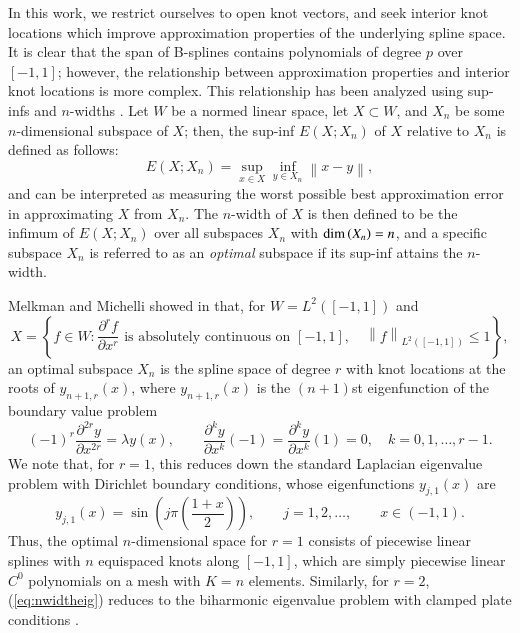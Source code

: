\documentclass[preprint,10pt]{elsarticle}
\newcommand{\pdn}[3]{\frac{\partial^{#3}#1}{\partial#2^{#3}}}
\newcommand{\nor}[1]{\left\| #1 \right\|}
\newcommand{\LRp}[1]{\left( #1 \right)}
\newcommand{\LRc}[1]{\left\{ #1 \right\}}
\begin{document}
In this work, we restrict ourselves to open knot vectors, and seek interior knot locations which improve approximation properties of the underlying spline space.  It is clear that the span of B-splines contains polynomials of degree $p$ over $[-1,1]$; however, the relationship between approximation properties and interior knot locations is more complex.  This relationship has been analyzed using sup-infs and $n$-widths \cite{kolmogoroffOber1936, melkman1978spline, schumaker2007spline, evans2009n}.  Let $W$ be a normed linear space, let $X \subset W$, and $X_n$ be some $n$-dimensional subspace of $X$; then, the sup-inf $E(X;X_n)$ of $X$ relative to $X_n$ is defined as follows: 
\[
E(X;X_n) =  \sup_{x\in X} \inf_{y\in X_n} \nor{x - y},
\]
and can be interpreted as measuring the worst possible best approximation error in approximating $X$ from $X_n$.  The $n$-width of $X$ is then defined to be the infimum of $E(X;X_n)$ over all subspaces $X_n$ with ${\rm dim}\LRp{X_n} = n$, and a specific subspace $X_n$ is referred to as an \textit{optimal} subspace if its sup-inf attains the $n$-width.

Melkman and Michelli showed in \cite{melkman1978spline} that, for $W = L^2([-1,1])$ and 
\[
X = \LRc{f \in W: \pdn{f}{x}{r} \text{ is absolutely continuous on } [-1,1], \quad \nor{f}_{L^2([-1,1])} \leq 1},
\]
an optimal subspace $X_n$ is the spline space of degree $r$ with knot locations at the roots of $y_{n+1,r}(x)$, where $y_{n+1,r}(x)$ is the $(n+1)$st eigenfunction of the boundary value problem
\begin{equation}
(-1)^r\pdn{y}{x}{2r} = \lambda y(x), \qquad \pdn{y}{x}{k}(-1) = \pdn{y}{x}{k}(1) = 0, \quad k = 0, 1, \ldots, r-1.
\label{eq:nwidtheig}
\end{equation}
We note that, for $r=1$, this reduces down the standard Laplacian eigenvalue problem with Dirichlet boundary conditions, whose eigenfunctions $y_{j,1}(x)$ are 
\[
y_{j,1}(x) = \sin\LRp{j \pi \LRp{\frac{1+x}{2}}}, \qquad j = 1,2,\ldots, \qquad x \in (-1,1).
\]
Thus, the optimal $n$-dimensional space for $r = 1$ consists of piecewise linear splines with $n$ equispaced knots along $[-1,1]$, which are simply piecewise linear $C^0$ polynomials on a mesh with $K = n$ elements.  Similarly, for $r = 2$, (\ref{eq:nwidtheig}) reduces to the biharmonic eigenvalue problem with clamped plate conditions \cite{brenner2007mathematical}.  
\end{document}
